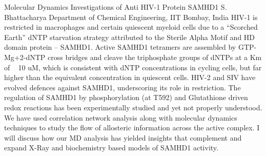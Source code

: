 
    \begin{abstract_online}{Molecular Dynamics Investigations of Anti HIV-1 Protein SAMHD1}{%
        S. Bhattacharya}{%
        \IStag}{%
        Department of Chemical Engineering, IIT Bombay, India}
    HIV-1 is restricted in macrophages and certain quiescent myeloid cells due to a “Scorched Earth” dNTP starvation strategy attributed to the Sterile Alpha Motif and HD domain protein – SAMHD1. Active SAMHD1 tetramers are assembled by GTP-Mg+2-dNTP cross bridges and cleave the triphosphate groups of dNTPs at a Km of ~ 10 uM, which is consistent with dNTP concentrations in cycling cells, but far higher than the equivalent concentration in quiescent cells. HIV-2 and SIV have evolved defences against SAMHD1, underscoring its role in restriction. The regulation of SAMHD1 by phosphorylation (at T592) and Glutathione driven redox reactions  has been experimentally studied and yet not properly understood. We have used correlation network analysis along with molecular dynamics techniques to study the flow of allosteric information across the active complex. I will discuss how our MD analysis has yielded insights that complement and expand X-Ray and biochemistry based models of SAMHD1 activity. 
    
    \end{abstract_online}
    